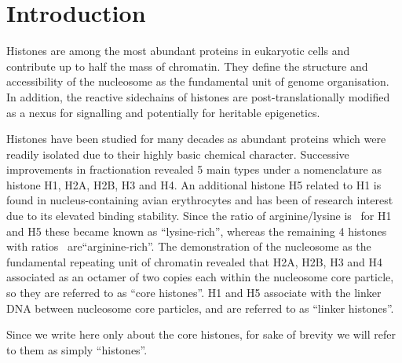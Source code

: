 \documentclass[10pt,a4paper]{article}
\begin{document}
  \section{Introduction}
  \label{sec:intro}

    Histones are among the most abundant proteins in eukaryotic cells and contribute up to half
    the mass of chromatin. They define the structure and accessibility of the nucleosome as the
    fundamental unit of genome organisation. In addition, the reactive sidechains of histones
    are post-translationally modified as a nexus for signalling and potentially for heritable
    epigenetics.

    Histones have been studied for many decades as abundant proteins which were readily isolated
    due to their highly basic chemical character. Successive improvements in fractionation revealed
    5 main types under a nomenclature as histone H1, H2A, H2B, H3 and H4\cite{Histonenomenc}. An additional histone H5
    related to H1 is found in nucleus-containing avian erythrocytes and has been of research interest
    due to its elevated binding stability. Since the ratio of arginine/lysine is \HOneArgLysRatio\ for H1 and H5 these
    became known as ``lysine-rich'', whereas the remaining 4 histones with ratios \OthersArgLysRatio\ are``arginine-rich''.
    The demonstration of the nucleosome as the fundamental repeating unit of chromatin revealed that H2A,
    H2B, H3 and H4 associated as an octamer of two copies each within the nucleosome core particle,
    so they are referred to as ``core histones''. H1 and H5 associate with the linker DNA between
    nucleosome core particles, and are referred to as ``linker histones''.

    Since we write here only about the core histones, for sake of brevity we will refer to them as simply ``histones''.
\end{document}
